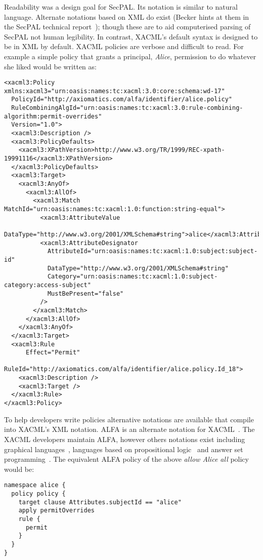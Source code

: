 \documentclass[thesis.tex]{subfiles}
\begin{document}
Readability was a design goal for SecPAL. Its notation is similar to natural
language. Alternate notations based on XML do exist (Becker hints at them in the
SecPAL technical report~\cite{becker_secpal:_2010}); though these are to aid
computerised parsing of SecPAL not human legibility. In contrast, XACML's
default syntax is designed to be in XML by default. XACML policies are verbose and difficult to read.
For example a simple policy that grants a principal, \emph{Alice}, permission to do whatever she liked would be written as:

\begin{lstlisting}
<xacml3:Policy xmlns:xacml3="urn:oasis:names:tc:xacml:3.0:core:schema:wd-17"
  PolicyId="http://axiomatics.com/alfa/identifier/alice.policy"
  RuleCombiningAlgId="urn:oasis:names:tc:xacml:3.0:rule-combining-algorithm:permit-overrides"
  Version="1.0">
  <xacml3:Description />
  <xacml3:PolicyDefaults>
    <xacml3:XPathVersion>http://www.w3.org/TR/1999/REC-xpath-19991116</xacml3:XPathVersion>
  </xacml3:PolicyDefaults>
  <xacml3:Target>
    <xacml3:AnyOf>
      <xacml3:AllOf>
        <xacml3:Match MatchId="urn:oasis:names:tc:xacml:1.0:function:string-equal">
          <xacml3:AttributeValue
            DataType="http://www.w3.org/2001/XMLSchema#string">alice</xacml3:AttributeValue>
          <xacml3:AttributeDesignator 
            AttributeId="urn:oasis:names:tc:xacml:1.0:subject:subject-id"
            DataType="http://www.w3.org/2001/XMLSchema#string"
            Category="urn:oasis:names:tc:xacml:1.0:subject-category:access-subject"
            MustBePresent="false"
          />
        </xacml3:Match>
      </xacml3:AllOf>
    </xacml3:AnyOf>
  </xacml3:Target>
  <xacml3:Rule 
      Effect="Permit"
      RuleId="http://axiomatics.com/alfa/identifier/alice.policy.Id_18">
    <xacml3:Description />
    <xacml3:Target />
  </xacml3:Rule>
</xacml3:Policy>
\end{lstlisting}

To help developers write policies alternative notations are available that
compile into XACML's XML notation. ALFA is an alternate notation for
XACML~\cite{oasis_xacml_technical_comitee_abbreviated_2015}. The XACML
developers maintain ALFA, however others notations exist including graphical
languages~\cite{henrik_nergaard_scratch-based_2015}, languages based on
propositional logic~\cite{zhang_synthesising_2004} and answer set
programming~\cite{ramli_xacml_2012}.  The equivalent ALFA policy of the above \emph{allow Alice all} policy would be:

\begin{lstlisting}
namespace alice {
  policy policy {
    target clause Attributes.subjectId == "alice"
    apply permitOverrides
    rule {
      permit
    }
  }
}
\end{lstlisting}
\end{document}
